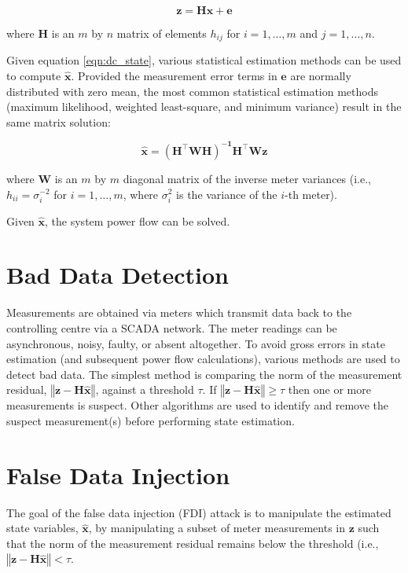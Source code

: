 \documentclass{article}
\begin{document}
\begin{equation}\label{eqn:dc_state}
    \mathbf{z = Hx + e}
\end{equation}

where $\mathbf{H}$ is an $m$ by $n$ matrix of elements $h_{ij}$ for $i = 1, \ldots, m$ and $j = 1, \ldots, n$.

Given equation \eqref{eqn:dc_state}, various statistical estimation methods can be used to compute $\mathbf{\hat{x}}$.  Provided the measurement error terms in $\mathbf{e}$ are normally distributed with zero mean, the most common statistical estimation methods (maximum likelihood, weighted least-square, and minimum variance) result in the same matrix solution:

\begin{equation}\label{eqn:x_hat_calc}
    \mathbf{\hat{x} = (H^\top W H)^{-1} H^\top W z}
\end{equation}

where $\mathbf{W}$ is an $m$ by $m$ diagonal matrix of the inverse meter variances (i.e., $h_{ii} = \sigma^{-2}_{i}$ for $i = 1, \ldots, m$, where $\sigma^2_i$ is the variance of the $i$-th meter).

Given $\mathbf{\hat{x}}$, the system power flow can be solved.

\section{Bad Data Detection}

Measurements are obtained via meters which transmit data back to the controlling centre via a SCADA network.  The meter readings can be asynchronous, noisy, faulty, or absent altogether.  To avoid gross errors in state estimation (and subsequent power flow calculations), various methods are used to detect bad data.  The simplest method is comparing the norm of the measurement residual, $\left\Vert \mathbf{z-H\hat{x}} \right\Vert$, against a threshold $\tau$.  If $\left\Vert \mathbf{z-H\hat{x}} \right\Vert \geq \tau$ then one or more measurements is suspect.  Other algorithms are used to identify and remove the suspect measurement(s) before performing state estimation.  

\section{False Data Injection}

The goal of the false data injection (FDI) attack is to manipulate the estimated state variables, $\mathbf{\hat{x}}$, by manipulating a subset of meter measurements in $\mathbf{z}$ such that the norm of the measurement residual remains below the threshold (i.e., $\left\Vert \mathbf{z-H\hat{x}} \right\Vert < \tau$.
\end{document}

